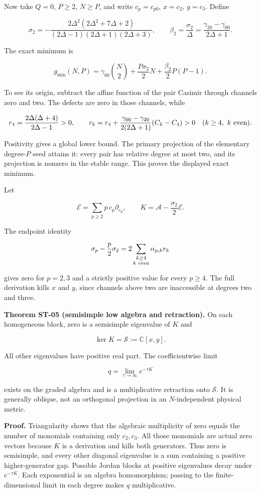 Now take \(Q=0\), \(P\geq2\), \(N\geq P\), and write \(c_p=c_{p0}\), \(x=c_2\), \(y=c_3\). Define

\[
\sigma_2=-\frac{2\Delta^2(2\Delta^2+7\Delta+2)}
{(2\Delta-1)(2\Delta+1)(2\Delta+3)},\qquad
\beta_2=\frac{\sigma_2}{\Delta}
=\frac{\gamma_{20}-\gamma_{00}}{2\Delta+1}.
\]

The exact minimum is

\[
g_{\min}(N,P)=
\gamma_{00}\binom N2+
\frac{P\sigma_2}{2}N+
\frac{\beta_2}{2}P(P-1).
\]

To see its origin, subtract the affine function of the pair Casimir through channels zero and two. The defects are zero in those channels, while

\[
r_4=\frac{2\Delta(\Delta+4)}{2\Delta-1}>0,\qquad
r_k=r_4+
\frac{\gamma_{00}-\gamma_{20}}{2(2\Delta+1)}(C_k-C_4)>0
\quad(k\geq4,\ k\ {\rm even}).
\]

Positivity gives a global lower bound. The primary projection of the elementary degree-\(P\) seed attains it: every pair has relative degree at most two, and its projection is nonzero in the stable range. This proves the displayed exact minimum.

Let

\[
\mathcal E=\sum_{p\geq2}p\,c_p\partial_{c_p},\qquad
K=\mathscr A-\frac{\sigma_2}{2}\mathcal E.
\]

The endpoint identity

\[
\sigma_p-\frac p2\sigma_2=
2\sum_{\substack{k\geq4\\k\ {\rm even}}}\alpha_{p,k}r_k
\]

gives zero for \(p=2,3\) and a strictly positive value for every \(p\geq4\). The full derivation kills \(x\) and \(y\), since channels above two are inaccessible at degrees two and three.

\textbf{Theorem ST-05 (semisimple low algebra and retraction).} On each homogeneous block, zero is a semisimple eigenvalue of \(K\) and

\[
\ker K=\mathcal S:=\mathbb C[x,y].
\]

All other eigenvalues have positive real part. The coefficientwise limit

\[
q=\lim_{\tau\to\infty}e^{-\tau K}
\]

exists on the graded algebra and is a multiplicative retraction onto \(\mathcal S\). It is generally oblique, not an orthogonal projection in an \(N\)-independent physical metric.

\textbf{Proof.} Triangularity shows that the algebraic multiplicity of zero equals the number of monomials containing only \(c_2,c_3\). All those monomials are actual zero vectors because \(K\) is a derivation and kills both generators. Thus zero is semisimple, and every other diagonal eigenvalue is a sum containing a positive higher-generator gap. Possible Jordan blocks at positive eigenvalues decay under \(e^{-\tau K}\). Each exponential is an algebra homomorphism; passing to the finite-dimensional limit in each degree makes \(q\) multiplicative.

